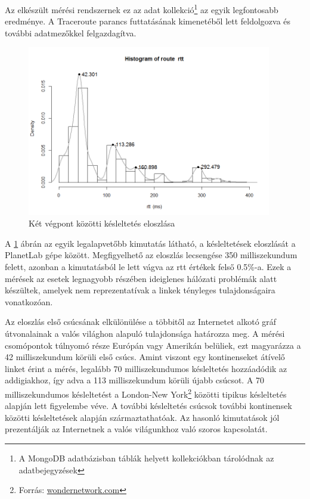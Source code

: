 Az elkészült mérési rendszernek ez az adat kollekció\footnote{A MongoDB adatbázisban táblák helyett kollekciókban tárolódnak az adatbejegyzések} az egyik legfontosabb eredménye. A Traceroute parancs futtatásának kimenetéből lett feldolgozva\cite{traceParse} és további adatmezőkkel felgazdagítva.

\begin{figure}[h!]
	\centering
	\includegraphics[width=0.95\textwidth, keepaspectratio]{figures/route_rtt_hist_max.png}
	\caption{Két végpont közötti késleltetés eloszlása}
	\label{fig:rtt-hist}
\end{figure}

A \ref{fig:rtt-hist} ábrán az egyik legalapvetőbb kimutatás látható, a késleltetések eloszlását a PlanetLab gépe között. Megfigyelhető az eloszlás lecsengése 350 milliszekundum felett, azonban a kimutatásból le lett vágva az rtt értékek felső 0.5\%-a. Ezek a mérések az esetek legnagyobb részében ideiglenes hálózati problémák alatt készültek, amelyek nem reprezentatívak a linkek tényleges tulajdonságaira vonatkozóan.

Az eloszlás első csúcsának elkülönülése a többitől az Internetet alkotó gráf útvonalainak a valós világhon alapuló tulajdonsága határozza meg. A mérési csomópontok túlnyomó része Európán vagy Amerikán belüliek, ezt magyarázza a 42 milliszekundum körüli első csúcs. Amint viszont egy kontinenseket átívelő linket érint a mérés, legalább 70 milliszekundumos késleltetés hozzáadódik az addigiakhoz, így adva a 113 milliszekundum körüli újabb csúcsot. A 70 milliszekundumos késleltetést a London-New York\footnote{Forrás: \href{https://wondernetwork.com/pings/New+York/London}{wondernetwork.com}} közötti tipikus késleltetés alapján lett figyelembe véve. A további késleltetés csúcsok további kontinensek közötti késleltetések alapján származtathatóak. Az hasonló kimutatások jól prezentálják az Internetnek a valós világunkhoz való szoros kapcsolatát.

